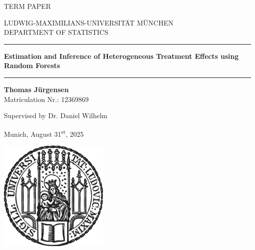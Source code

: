 \begin{titlepage}
\begin{center}

\Large
TERM PAPER

\vspace{0.5cm}
\Large
LUDWIG-MAXIMILIANS-UNIVERSITÄT MÜNCHEN\\
DEPARTMENT OF STATISTICS

\vspace{0.5cm}

\rule{\textwidth}{1.5pt}
\LARGE
\textbf{Estimation and Inference of Heterogeneous Treatment Effects using Random Forests}
\rule{\textwidth}{1.5pt}

\vspace{0.5cm}

\Large
\textbf{Thomas Jürgensen}\\
\large
Matriculation Nr.: 12369869

\vspace{0.5cm}

Supervised by Dr. Daniel Wilhelm

\vspace{0.5cm}

\large
Munich, August 31\textsuperscript{st}, 2025
      
\vspace{0.5cm}

\includegraphics[width = 0.4\textwidth]{sigillum.png}

\vspace{0.5cm}

\end{center}
\end{titlepage}
\newpage
\newpage
